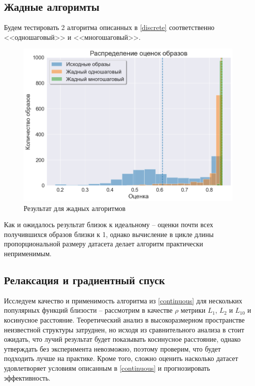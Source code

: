 \documentclass[a4paper,14pt]{extarticle}
\begin{document}
			\subsection{Жадные алгоримты}
				Будем тестировать 2 алгоритма описанных в \ref{discrete} соответственно <<одношаговый>> и <<многошаговый>>.
				\begin{figure}[h!]
					\centering
					\includegraphics[scale = 0.6]{../figures/greedy_at_least_5_subset1000.png}
					\caption{Результат для жадных алгоритмов}
				\end{figure}
			
				Как и ожидалось результат близок к идеальному -- оценки почти всех получившихся образов близки к 1, однако вычисление в цикле длины пропорциональной размеру датасета делает алгоритм практически неприменимым. 
				
			\subsection{Релаксация и градиентный спуск}\label{continuous test}
			Исследуем качество и применимость алгоритма из \ref{continuous} для нескольких популярных функций близости -- рассмотрим в качестве $\rho$ метрики $L_1$, $L_2$ и $L_{10}$ и косинусное расстояние. Теоретический анализ в высокоразмерном пространстве неизвестной структуры затруднен, но исходя из сравнительного анализа в \cite{shirkhorshidi2015comparison} стоит ожидать, что лучий результат будет показывать косинусное расстояние, однако утверждать без эксперимента невозможно, поэтому проверим, что будет подходить лучше на практике. Кроме того, сложно оценить насколько датасет удовлетворяет условиям описанным в \ref{continuous} и прогнозировать эффективность.
			
\end{document}
